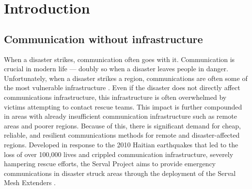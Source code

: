 
\chapter{Introduction}\label{chapter:firstchapter} %

\label{Chapter1} %

\section{Communication without infrastructure}
When a disaster strikes, communication often goes with it.
Communication is crucial in modern life — doubly so when a disaster leaves people in danger.
Unfortunately, when a disaster strikes a region, communications are often some of the most vulnerable infrastructure \parencite{gardner2011serval}.
Even if the disaster does not directly affect communications infrastructure, this infrastructure is often overwhelmed by victims attempting to contact rescue teams.
This impact is  further compounded in areas with already insufficient communication infrastructure such as remote areas and poorer regions.
Because of this, there is significant demand for cheap, reliable, and resilient communications methods for remote and disaster-affected regions.
Developed in response to the 2010 Haitian earthquakes that led to the loss of over 100,000 lives and crippled communication infrastructure, severely hampering rescue efforts, the Serval Project aims to provide emergency communications in disaster struck areas through the deployment of the Serval Mesh Extenders \parencite{gardner2011serval}.


